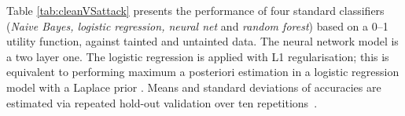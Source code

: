 Table \ref{tab:cleanVSattack} presents the performance
of four standard classifiers ({\em  Naive Bayes, logistic regression, neural net} and {\em  random forest}) based on a 0--1 utility function, against tainted and untainted data. The neural network model is a two layer one. The logistic regression is applied with L1 regularisation; {this  is equivalent to performing maximum a posteriori estimation in a logistic regression model with a Laplace prior \cite{park2008bayesian}}. %
Means and standard deviations of accuracies are estimated via repeated hold-out validation over ten repetitions~\cite{kim2009estimating}.
%



